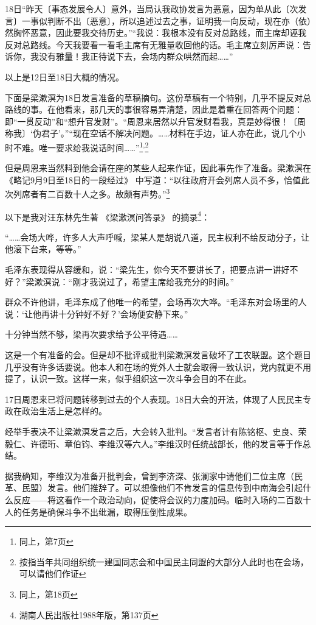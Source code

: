 \documentclass[a4paper,punct=kaiming]{ctexart}
\begin{document}
18日\quad “昨天〔事态发展令人〕意外，当局认我政协发言为恶意，因为单从此〔次发言〕一事似判断不出〔恶意〕，所以追述过去之事，证明我一向反动，现在亦（依）然胸怀恶意，因此要我交待历史。”“我说：我根本没有反对总路线，而主席却诬我反对总路线。今天我要看一看毛主席有无雅量收回他的话。毛主席立刻厉声说：告诉你，我没有雅量！我正待说下去，会场内群众哄然而起……”

以上是12日至18日大概的情况。

下面是梁漱溟为18日发言准备的草稿摘句。这份草稿有一个特别，几乎不提反对总路线的事。在他看来，那几天的事很容易弄清楚，因此是着重在回答两个问题：即“一贯反动”和“想升官发财”。“周恩来居然以升官发财看我，真是妙得很！〔周称我〕‘伪君子’。”“现在空话不解决问题。……材料在手边，证人亦在此，说几个小时不难。唯一要求给我说话时间……”\footnote{同上，第7页}\textsuperscript{,}\footnote{按指当年共同组织统一建国同志会和中国民主同盟的大部分人此时也在会场，可以请他们作证}

但是周恩来当然料到他会请在座的某些人起来作证，因此事先作了准备。梁漱溟在 《略记9月9日至18日的一段经过》 中写道：“以往政府开会列席人员不多，恰值此次列席者有二百数十人之多。故颇有声势。”\footnote{同上，第18页}

以下是我对汪东林先生著 《梁漱溟问答录》 的摘录\footnote{湖南人民出版社1988年版，第137页}：

“……会场大哗，许多人大声呼喊，梁某人是胡说八道，民主权利不给反动分子，让他滚下台来，等等。”

毛泽东表现得从容缓和，说：“梁先生，你今天不要讲长了，把要点讲一讲好不好？”梁漱溟说：“刚才我说过了，希望主席给我充分的时间。”

群众不许他讲，毛泽东成了他唯一的希望，会场再次大哗。“毛泽东对会场里的人说：‘让他再讲十分钟好不好？’会场便安静下来。”

十分钟当然不够，梁再次要求给予公平待遇……

这是一个有准备的会。但是却不批评或批判梁漱溟发言破坏了工农联盟。这个题目几乎没有许多话要说。他本人和在场的党外人士就会取得一致认识，党内就更不用提了，认识一致。这样一来，似乎组织这一次斗争会目的不在此。

17日周恩来已将问题转移到过去的个人表现。18日大会的开法，体现了人民民主专政在政治生活上是怎样的。

经举手表决不让梁漱溟发言之后，大会转入批判。“发言者计有陈铭枢、史良、荣毅仁、许德珩、章伯钧、李维汉等六人。”李维汉时任统战部长，他的发言等于作总结。

据我确知，李维汉为准备开批判会，曾到李济深、张澜家中请他们二位主席（民革、民盟）发言。他们推辞了。可以想像他们不肯发言的信息传到中南海会引起什么反应——将这看作一个政治动向，促使将会议的力度加码。临时入场的二百数十人的任务是确保斗争不出纰漏，取得压倒性成果。
\end{document}
